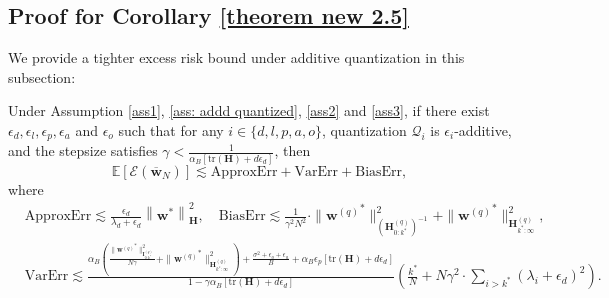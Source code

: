 \documentclass[11pt, letterpaper]{article}
\begin{document}
\subsection{Proof for Corollary \ref{theorem new 2.5}}
\label{Proof for Theorem 4.3}
We provide a tighter excess risk bound under additive quantization in this subsection:
\begin{corollary}
    \label{theorem new 2.5, proof}
    Under Assumption \ref{ass1}, \ref{ass: addd quantized}, \ref{ass2} and \ref{ass3}, if there exist $\epsilon_d,\epsilon_l,\epsilon_p,\epsilon_a$ and $\epsilon_o$ such that for any $i\in \{d,l,p,a,o\}$, quantization $\mathcal{Q}_i$ is $\epsilon_i$-additive, and the stepsize satisfies $\gamma < \frac{1}{\alpha_B [\mathrm{tr}(\mathbf{H})+d\epsilon_d]}$, then
    \begin{equation*}
        \mathbb{E}[\mathcal{E}(\overline{\mathbf{w}}_N)] \lesssim \mathrm{ApproxErr}+\mathrm{ VarErr}+\mathrm{BiasErr},
    \end{equation*}
    where
    \begin{align*}
            &\mathrm{ApproxErr}\lesssim \frac{\epsilon_d}{\lambda_d+\epsilon_d}\left\|\mathbf{w}^*\right\|_\mathbf{H}^2,\quad \mathrm{BiasErr}\lesssim\frac{1}{\gamma^2N^2}\cdot\|{\mathbf{w}^{(q)}}^*\|_{(\mathbf{H}_{0:k^*}^{(q)})^{-1}}^2+\|{\mathbf{w}^{(q)}}^*\|_{\mathbf{H}_{k^*:\infty}^{(q)}}^2,\\
            &\mathrm{VarErr}\lesssim \frac{\alpha_B\left(\frac{\|{\mathbf{w}^{(q)}}^*\|_{\mathbf{I}_{0:k^*}^{(q)}}^2}{N\gamma}+\|{\mathbf{w}^{(q)}}^*\|_{\mathbf{H}_{k^*:\infty}^{(q)}}^2\right)+\frac{\sigma^2+\epsilon_o+\epsilon_a}{B}+\alpha_B \epsilon_p[\mathrm{tr}(\mathbf{H})+d\epsilon_d]}{1-\gamma\alpha_B[\mathrm{tr}(\mathbf{H})+d\epsilon_d]}\left(\frac{k^*}{N}+N\gamma^2\cdot\sum_{i>k^*}(\lambda_i+\epsilon_d)^2\right).
    \end{align*}
\end{corollary}
\end{document}
